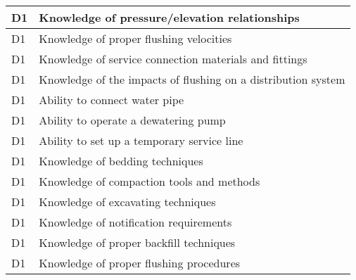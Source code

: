 \begin{table}[H]
\begin{tabular}{| m{1cm} | m{15cm} |}
D1 & Knowledge of   pressure/elevation relationships                                                                \\ \hline
D1 & Knowledge of proper   flushing velocities                                                                      \\ \hline
D1 & Knowledge of service   connection materials and fittings                                                       \\ \hline
D1 & Knowledge of the   impacts of flushing on a distribution system                                                \\ \hline
D1 & Ability to connect   water pipe                                                                                \\ \hline
D1 & Ability to operate a   dewatering pump                                                                         \\ \hline
D1 & Ability to set up a   temporary service line                                                                   \\ \hline
D1 & Knowledge of bedding   techniques                                                                              \\ \hline
D1 & Knowledge of   compaction tools and methods                                                                    \\ \hline
D1 & Knowledge of   excavating techniques                                                                           \\ \hline
D1 & Knowledge of   notification requirements                                                                       \\ \hline
D1 & Knowledge of proper   backfill techniques                                                                      \\ \hline
D1 & Knowledge of proper   flushing procedures                                                                      \\ \hline
\end{tabular}
\end{table}
\newpage







